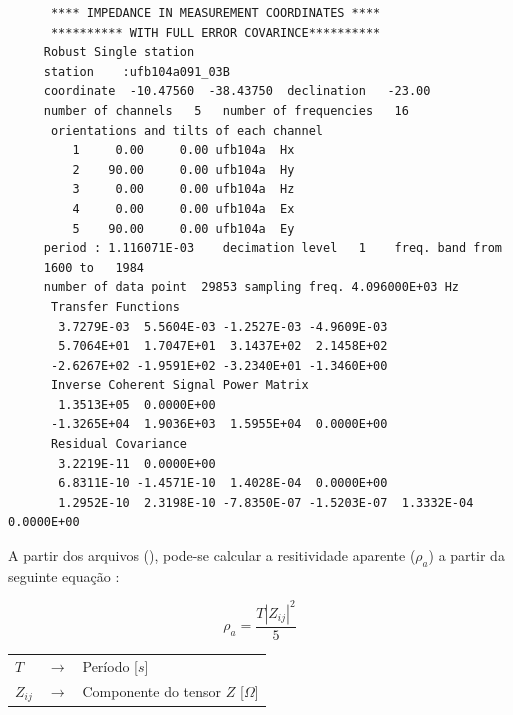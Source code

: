 \begin{footnotesize}        
\begin{verbatim}
      **** IMPEDANCE IN MEASUREMENT COORDINATES ****
      ********** WITH FULL ERROR COVARINCE**********
     Robust Single station                                                           
     station    :ufb104a091_03B      
     coordinate  -10.47560  -38.43750  declination   -23.00
     number of channels   5   number of frequencies   16
      orientations and tilts of each channel 
         1     0.00     0.00 ufb104a  Hx    
         2    90.00     0.00 ufb104a  Hy    
         3     0.00     0.00 ufb104a  Hz    
         4     0.00     0.00 ufb104a  Ex    
         5    90.00     0.00 ufb104a  Ey    
     period : 1.116071E-03    decimation level   1    freq. band from
     1600 to   1984
     number of data point  29853 sampling freq. 4.096000E+03 Hz
      Transfer Functions
       3.7279E-03  5.5604E-03 -1.2527E-03 -4.9609E-03
       5.7064E+01  1.7047E+01  3.1437E+02  2.1458E+02
      -2.6267E+02 -1.9591E+02 -3.2340E+01 -1.3460E+00
      Inverse Coherent Signal Power Matrix
       1.3513E+05  0.0000E+00
      -1.3265E+04  1.9036E+03  1.5955E+04  0.0000E+00
      Residual Covariance
       3.2219E-11  0.0000E+00
       6.8311E-10 -1.4571E-10  1.4028E-04  0.0000E+00
       1.2952E-10  2.3198E-10 -7.8350E-07 -1.5203E-07  1.3332E-04  0.0000E+00                                     
\end{verbatim}
\end{footnotesize}
        
        A partir dos arquivos  (), pode-se calcular a resitividade aparente ($\rho_a$) a partir da seguinte equação \cite{z-files}:
        
        \begin{equation}
         \rho_a = \dfrac{T|Z_{ij}|^2}{5}
        \end{equation}

        {\footnotesize \noindent
            \begin{table}[H]
                \begin{tabular*}{1cm}{p{0.05cm}p{0.1cm}p{10cm}}
                    {\footnotesize $T$}          & {\footnotesize $\rightarrow$} & {\footnotesize Período [$s$] }\\
                    {\footnotesize $Z_{ij}$}  & {\footnotesize $\rightarrow$} & {\footnotesize Componente do tensor $Z$ [$\Omega$] }\\
                \end{tabular*}
            \end{table}}
        
